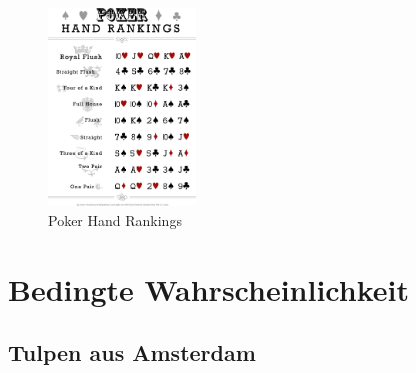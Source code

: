 \documentclass[%
11pt,%
twoside,%
titlepage,%
german,%
headsepline%
]{scrartcl}
\begin{document}
\begin{figure}
\centering
\includegraphics[width=0.35\textwidth]{pictures/PokerHandRankings.png}
\caption{Poker Hand Rankings}
\end{figure}

\clearpage

\section{Bedingte Wahrscheinlichkeit}
\subsection{Tulpen aus Amsterdam}
\end{document}
